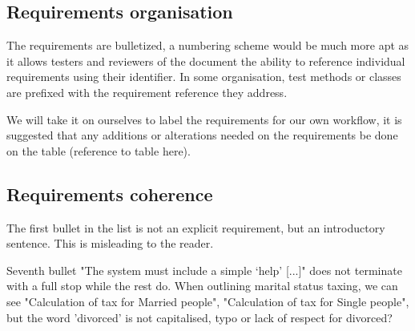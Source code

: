
\subsection{Requirements organisation}
The requirements are bulletized, a numbering scheme would be much more apt as it allows testers and reviewers of the document the ability to reference individual requirements using their identifier. In some organisation, test methods or classes are prefixed with the requirement reference they address. 

We will take it on ourselves to label the requirements for our own workflow, it is suggested that any additions or alterations needed on the requirements be done on the table (reference to table here).

\subsection{Requirements coherence}

The first bullet in the list is not an explicit requirement, but an introductory sentence. This is misleading to the reader. 

Seventh bullet "The system must include a simple ‘help’ [...]" does not terminate with a full stop while the rest do. 
When outlining marital status taxing, we can see "Calculation of tax for Married people", "Calculation of tax for Single people", but the word 'divorced' is not capitalised, typo or lack of respect for divorced?  

